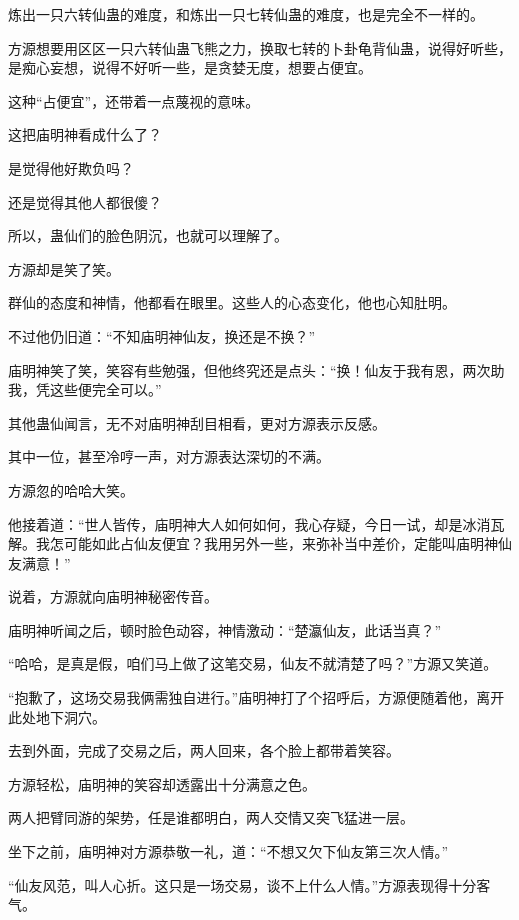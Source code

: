 
\begin{this_body}



炼出一只六转仙蛊的难度，和炼出一只七转仙蛊的难度，也是完全不一样的。

方源想要用区区一只六转仙蛊飞熊之力，换取七转的卜卦龟背仙蛊，说得好听些，是痴心妄想，说得不好听一些，是贪婪无度，想要占便宜。

这种“占便宜”，还带着一点蔑视的意味。

这把庙明神看成什么了？

是觉得他好欺负吗？

还是觉得其他人都很傻？

所以，蛊仙们的脸色阴沉，也就可以理解了。

方源却是笑了笑。

群仙的态度和神情，他都看在眼里。这些人的心态变化，他也心知肚明。

不过他仍旧道：“不知庙明神仙友，换还是不换？”

庙明神笑了笑，笑容有些勉强，但他终究还是点头：“换！仙友于我有恩，两次助我，凭这些便完全可以。”

其他蛊仙闻言，无不对庙明神刮目相看，更对方源表示反感。

其中一位，甚至冷哼一声，对方源表达深切的不满。

方源忽的哈哈大笑。

他接着道：“世人皆传，庙明神大人如何如何，我心存疑，今日一试，却是冰消瓦解。我怎可能如此占仙友便宜？我用另外一些，来弥补当中差价，定能叫庙明神仙友满意！”

说着，方源就向庙明神秘密传音。

庙明神听闻之后，顿时脸色动容，神情激动：“楚瀛仙友，此话当真？”

“哈哈，是真是假，咱们马上做了这笔交易，仙友不就清楚了吗？”方源又笑道。

“抱歉了，这场交易我俩需独自进行。”庙明神打了个招呼后，方源便随着他，离开此处地下洞穴。

去到外面，完成了交易之后，两人回来，各个脸上都带着笑容。

方源轻松，庙明神的笑容却透露出十分满意之色。

两人把臂同游的架势，任是谁都明白，两人交情又突飞猛进一层。

坐下之前，庙明神对方源恭敬一礼，道：“不想又欠下仙友第三次人情。”

“仙友风范，叫人心折。这只是一场交易，谈不上什么人情。”方源表现得十分客气。


\end{this_body}
